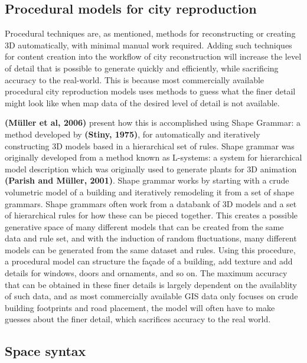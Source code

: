 \documentclass{kththesis}
\begin{document}
\subsection{Procedural models for city reproduction}

Procedural techniques are, as mentioned, methods for reconstructing or creating 3D automatically, with minimal manual work required.
Adding such techniques for content creation into the workflow of city reconstruction will increase the level of detail that is possible to generate quickly and efficiently, while sacrificing accuracy to the real-world.
This is because most commercially available procedural city reproduction models uses methods to guess what the finer detail might look like when map data of the desired level of detail is not available.

\textbf{(Müller et al, 2006)} present how this is accomplished using Shape Grammar: a method developed by \textbf{(Stiny, 1975)}, for automatically and iteratively constructing 3D models based in a hierarchical set of rules.
Shape grammar was originally developed from a method known as L-systems: a system for hierarchical model description which was originally used to generate plants for 3D animation \textbf{(Parish and Müller, 2001)}.
Shape grammar works by starting with a crude volumetric model of a building and iteratively remodeling it from a set of shape grammars.
Shape grammars often work from a databank of 3D models and a set of hierarchical rules for how these can be pieced together.
This creates a possible generative space of many different models that can be created from the same data and rule set, and with the induction of random fluctuations, many different models can be generated from the same dataset and rules.
Using this procedure, a procedural model can structure the façade of a building, add texture and add details for windows, doors and ornaments, and so on.
The maximum accuracy that can be obtained in these finer details is largely dependent on the availablity of such data, and as most commercially available GIS data only focuses on crude building footprints and road placement, the model will often have to make guesses about the finer detail, which sacrifices accuracy to the real world.

\subsection{Space syntax}
\end{document}
